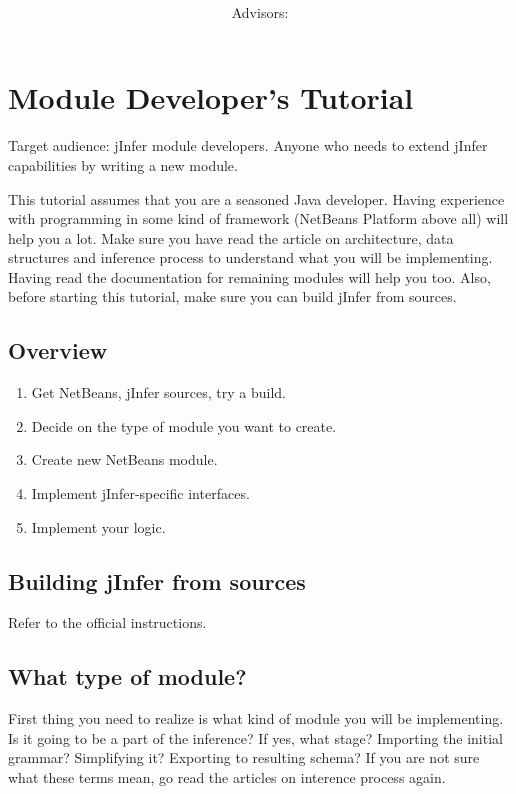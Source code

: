 \documentclass[a4paper,10pt,oneside]{article}
\title{\bf\mftitle}
\author{\mfauthor \\ Advisors: \mfadvisor}
\date{\mfplacedate}
\begin{document}
\maketitle

\section*{Module Developer's Tutorial}
\par 
  Target audience: jInfer module developers. Anyone who needs to extend jInfer capabilities by writing a new module.

\par 
  
    This tutorial assumes that you are a seasoned Java developer. Having
    experience with programming in some kind of framework (NetBeans Platform
    above all) will help you a lot.
    Make sure you have read the article on
    architecture, data structures and inference process to understand what you
    will be implementing. Having read the documentation for
    remaining modules will help you too.
    Also, before starting this tutorial, make sure you can
    build jInfer from sources.
  

\subsection*{Overview}
  \begin{enumerate}
    \item Get NetBeans, jInfer sources, try a build.
    \item Decide on the type of module you want to create.
    \item Create new NetBeans module.
    \item Implement jInfer-specific interfaces.
    \item Implement your logic.
  \end{enumerate}
\subsection*{Building jInfer from sources}
  \par 
    Refer to the official instructions.
  
\subsection*{What type of module?}
  \par 
    First thing you need to realize is what kind of module you will be
    implementing. Is it going to be a part of the inference? If yes, what stage?
    Importing the initial grammar? Simplifying it? Exporting to resulting schema?
    If you are not sure what these terms mean, go read the articles on interence process again.
  
\end{document}
